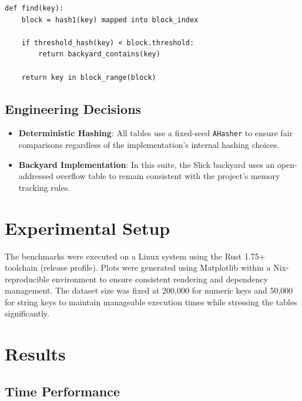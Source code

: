 \documentclass[11pt,a4paper]{article}
\begin{document}
\begin{lstlisting}[style=pseudocode, caption={Slick Hashing -- find}]
def find(key):
    block = hash1(key) mapped into block_index

    if threshold_hash(key) < block.threshold:
        return backyard_contains(key)

    return key in block_range(block)
\end{lstlisting}

\subsection{Engineering Decisions}

\begin{itemize}
  \item \textbf{Deterministic Hashing}: All tables use a fixed-seed \texttt{AHasher} to ensure fair comparisons regardless of the implementation's internal hashing choices.
  \item \textbf{Backyard Implementation}: In this suite, the Slick backyard uses an open-addressed overflow table to remain consistent with the project's memory tracking rules.
\end{itemize}

\section{Experimental Setup}

The benchmarks were executed on a Linux system using the Rust 1.75+ toolchain (release profile). Plots were generated using Matplotlib within a Nix-reproducible environment to ensure consistent rendering and dependency management. The dataset size was fixed at 200,000 for numeric keys and 50,000 for string keys to maintain manageable execution times while stressing the tables significantly.

\section{Results}

\subsection{Time Performance}
\end{document}
